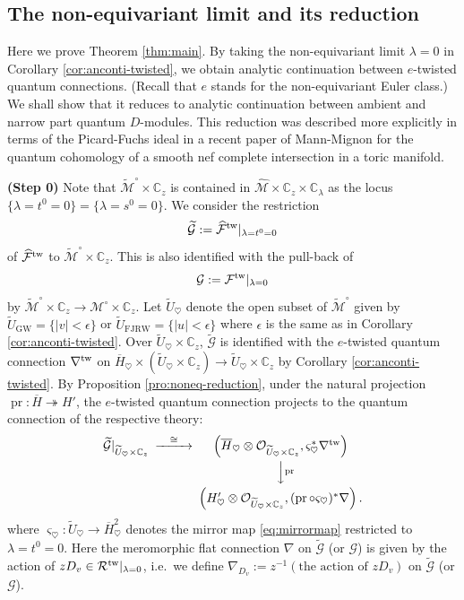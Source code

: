 \documentclass[11pt]{amsart}
\theoremstyle{definition} %
\theoremstyle{remark} %
\newcommand{\CC}{\mathbb C}
\newcommand{\tw}{{\rm tw}}
\def\GW{\operatorname{\text{GW}}}
\newcommand{\cO}{\mathcal{O}}
\newcommand{\cM}{\mathcal{M}}
\newcommand{\cMo}{\mathcal{M}^\circ}
\newcommand{\hcM}{\widehat{\cM}}
\newcommand{\tcMo}{\widetilde{\cM}^\circ}
\newcommand{\cF}{\mathcal{F}}
\newcommand{\cG}{\mathcal{G}}
\newcommand{\tcG}{\widetilde{\cG}}
\newcommand{\hcF}{\widehat{\cF}}
\newcommand{\cR}{\mathcal{R}}
\newcommand{\FJRW}{{\operatorname{FJRW}}}
\renewcommand{\GW}{{\operatorname{GW}}}
\newcommand{\pr}{\operatorname{pr}}
\newcommand{\tU}{\widetilde{U}}
\newcommand{\ov}{\overline}
\begin{document}
\subsection{The non-equivariant limit and its reduction}
\label{subsec:reduction}
Here we prove Theorem \ref{thm:main}. 
By taking the non-equivariant limit $\lambda =0$ 
in Corollary \ref{cor:anconti-twisted}, we obtain 
analytic continuation between $e$-twisted quantum connections. 
(Recall that $e$ stands for the non-equivariant 
Euler class.)
We shall show 
that it reduces to analytic continuation 
between ambient and narrow part quantum $D$-modules. 
This reduction was described more explicitly in terms 
of the Picard-Fuchs ideal 
in a recent paper of Mann-Mignon \cite[Theorem 1.2]{Mann-Mignon} 
for the quantum cohomology of a smooth nef complete intersection 
in a toric manifold. 

\vspace{5pt} 
\noindent 
{\bf (Step 0)} 
Note that $\tcMo\times \CC_z$ is contained in 
$\hcM\times \CC_z \times \CC_\lambda$ 
as the locus $\{\lambda=t^0=0\} = \{\lambda = s^0=0\}$. 
We consider the restriction 
\[
\tcG := \hcF^\tw|_{\lambda=t^0=0}
\]
of $\hcF^\tw$ to $\tcMo\times \CC_z$. 
This is also identified with the pull-back of 
\[
\cG: = \cF^\tw|_{\lambda=0}
\] by 
$\tcMo\times \CC_z \to \cMo\times\CC_z$. 
Let $\tU_\heartsuit$ denote the open subset 
of $\tcMo$ given by 
$\tU_{\GW} = \{|v|<\epsilon \}$ or 
$\tU_{\FJRW} = \{|u|<\epsilon\}$ 
where $\epsilon$ is the same as in 
Corollary \ref{cor:anconti-twisted}. 
Over $\tU_\heartsuit \times \CC_z$, 
$\tcG$ is identified with the 
$e$-twisted quantum connection $\nabla^\tw$ on 
$\ov{H}_\heartsuit \times (\tU_\heartsuit \times \CC_z) 
\to \tU_\heartsuit \times \CC_z$ 
by Corollary \ref{cor:anconti-twisted}. 
By Proposition \ref{pro:noneq-reduction}, 
under the natural projection $\pr \colon \ov{H}
\twoheadrightarrow H'$, the $e$-twisted quantum 
connection projects to the quantum connection 
of the respective theory: 
\begin{align} 
\label{eq:mirrorisom-lambdazero} 
\begin{CD} 
\tcG|_{\tU_\heartsuit \times \CC_z} @>{\cong}>>  
\left( \ov{H}_\heartsuit \otimes \cO_{\tU_\heartsuit \times \CC_z}, 
\varsigma_\heartsuit^* \nabla^\tw
\right)  \\ 
@. @VV{\pr}V \\ 
@. \left( 
H'_\heartsuit \otimes \cO_{\tU_\heartsuit \times \CC_z},  
(\pr \circ \varsigma_\heartsuit)^* \nabla\right).   
\end{CD} 
\end{align} 
where $\varsigma_\heartsuit\colon \tU_\heartsuit \to \ov{H}^2_\heartsuit$ 
denotes the mirror map 
\eqref{eq:mirrormap} restricted to $\lambda = t^0 =0$. 
Here the meromorphic flat connection $\nabla$ 
on $\tcG$ (or $\cG$) is given by 
the action of $z D_v\in \cR^\tw|_{\lambda=0}$, i.e.\ 
we define $\nabla_{D_v} := z^{-1} (\text{the action of $zD_v$})$ 
on $\tcG$ (or $\cG$).  
\end{document}
